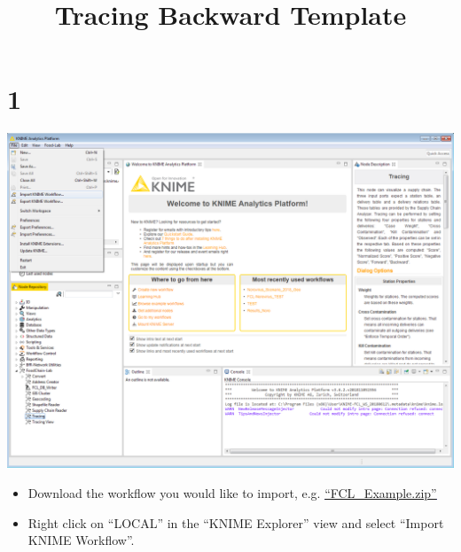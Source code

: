 \documentclass[10pt]{beamer}
\title{Tracing Backward Template}
\date{}
\begin{document}
\maketitle

\section{1}
\begin{frame}
	\begin{center}
  		\includegraphics[height=0.6\textheight]{1.png}
	\end{center}
	\begin{itemize}
		\item Download the workflow you would like to import, e.g.
    \textcolor{blue}{\underline{\href{https://github.com/SiLeBAT/BfROpenLabResources/raw/master/GitHubPages/workflows/FCL\_Example.zip}{``FCL\_Example.zip''}}}
		\item Right click on ``LOCAL'' in the ``KNIME Explorer'' view and select ``Import KNIME Workflow''.
	\end{itemize}
\end{frame}
\end{document}
